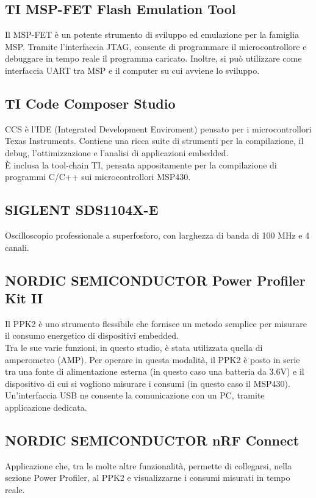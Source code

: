 \documentclass[target=bach,aauheader=,style=]{thud}
\begin{document}
		\subsection{TI MSP-FET Flash Emulation Tool}
		Il MSP-FET è un potente strumento di sviluppo ed emulazione per la famiglia MSP. Tramite l'interfaccia JTAG, consente di programmare il microcontrollore e debuggare in tempo reale il programma caricato. Inoltre, si può utilizzare come interfaccia UART tra MSP e il computer su cui avviene lo sviluppo.
		
		\subsection{TI Code Composer Studio}
		CCS è l'IDE (Integrated Development Enviroment) pensato per i microcontrollori Texas Instruments. Contiene una ricca suite di strumenti per la compilazione, il debug, l'ottimizzazione e l'analisi di applicazioni embedded.\\
	    È inclusa la tool-chain TI, pensata appositamente per la compilazione di programmi C/C++ sui microcontrollori MSP430.
		
		\subsection{SIGLENT SDS1104X-E}
		Oscilloscopio professionale a superfosforo, con larghezza di banda di 100 MHz e 4 canali.
		
		\subsection{NORDIC SEMICONDUCTOR Power Profiler Kit II}
		Il PPK2 è uno strumento flessibile che fornisce un metodo semplice per misurare il consumo energetico di dispositivi embedded.\\
		Tra le sue varie funzioni, in questo studio, è stata utilizzata quella di amperometro (AMP). Per operare in questa modalità, il PPK2 è posto in serie tra una fonte di alimentazione esterna (in questo caso una batteria da 3.6V) e il dispositivo di cui si vogliono misurare i consumi (in questo caso il MSP430).\\
		Un'interfaccia USB ne consente la comunicazione con un PC, tramite applicazione dedicata.
		
		\subsection{NORDIC SEMICONDUCTOR nRF Connect}
		Applicazione che, tra le molte altre funzionalità, permette di collegarsi, nella sezione Power Profiler, al PPK2 e visualizzarne i consumi misurati in tempo reale.
\end{document}
